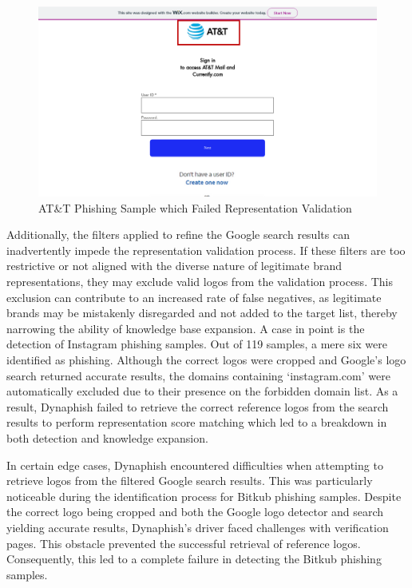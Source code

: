 \begin{figure}[H]
\caption{AT\&T Phishing Sample which Failed Representation Validation}
\centering
\includegraphics[width=1\textwidth]{images/at_t_phishing.png}
\end{figure}

Additionally, the filters applied to refine the Google search results can inadvertently impede the representation validation process. If these filters are too restrictive or not aligned with the diverse nature of legitimate brand representations, they may exclude valid logos from the validation process. This exclusion can contribute to an increased rate of false negatives, as legitimate brands may be mistakenly disregarded and not added to the target list, thereby narrowing the ability of knowledge base expansion. A case in point is the detection of Instagram phishing samples. Out of 119 samples, a mere six were identified as phishing. Although the correct logos were cropped and Google's logo search returned accurate results, the domains containing `instagram.com' were automatically excluded due to their presence on the forbidden domain list. As a result, Dynaphish failed to retrieve the correct reference logos from the search results to perform representation score matching which led to a breakdown in both detection and knowledge expansion.

In certain edge cases, Dynaphish encountered difficulties when attempting to retrieve logos from the filtered Google search results. This was particularly noticeable during the identification process for Bitkub phishing samples. Despite the correct logo being cropped and both the Google logo detector and search yielding accurate results, Dynaphish's driver faced challenges with verification pages. This obstacle prevented the successful retrieval of reference logos. Consequently, this led to a complete failure in detecting the Bitkub phishing samples.

